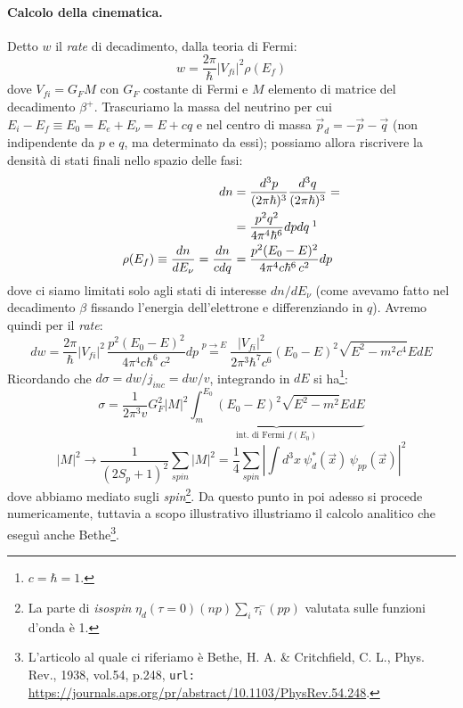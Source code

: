 \paragraph{Calcolo della cinematica.}Detto $w$ il \textit{rate} di decadimento, dalla teoria di Fermi:
$$w = \frac{2\pi}{\hbar}|V_{fi}|^2\rho(E_f)$$
dove $V_{fi} = G_F M$ con $G_F$ costante di Fermi e $M$ elemento di matrice del decadimento $\beta^+$. Trascuriamo la massa del neutrino per cui $E_i-E_f\equiv E_0 = E_e + E_\nu = E + cq$ e nel centro di massa $\vec{p}_d = -\vec{p}-\vec{q}$ (non indipendente da $p$ e $q$, ma determinato da essi); possiamo allora riscrivere la densità di stati finali nello spazio delle fasi:
\begin{displaymath}
\begin{aligned}
dn &= \frac{d^3 p}{(2\pi\hbar)^3}\frac{d^3 q}{(2\pi\hbar)^3} =\\
&= \frac{p^2 q^2}{4\pi^4 \hbar^6} dpdq\: \footnotemark \\
\rho(E_f)\equiv \frac{dn}{dE_\nu} = \frac{dn}{cdq} &= \frac{p^2 (E_0-E)^2}{4\pi^4 c \hbar^6\,c^2} dp
\end{aligned}
\end{displaymath}
dove ci siamo limitati solo agli stati di interesse $dn/dE_\nu$ (come avevamo fatto nel decadimento $\beta$ fissando l'energia dell'elettrone e differenziando in $q$). Avremo quindi per il \textit{rate}:
$$dw = \frac{2\pi}{\hbar}|V_{fi}|^2\,\frac{p^2 (E_0-E)^2}{4\pi^4 c \hbar^6\,c^2} dp \stackrel{p\to E}{=} \frac{|V_{fi}|^2}{2\pi^3 \hbar^7 c^6} (E_0-E)^2 \sqrt{E^2 - m^2c^4} E dE $$
Ricordando che $d\sigma = dw/j_{inc} = dw/v$, integrando in $dE$ si ha\footnote{$c=\hbar=1$.}:
$$\sigma = \frac{1}{2\pi^3 v} G_F^2 |M|^2 \underbrace{\int_m^{E_0} (E_0-E)^2 \sqrt{E^2-m^2}E dE}_{\text{int. di Fermi } f(E_0)} $$
$$|M|^2 \to \frac{1}{(2S_p +1)^2} \sum_{spin} |M|^2 = \frac{1}{4} \sum_{spin} |\int d^3x\: \psi^*_d (\vec{x})\,\psi_{pp}(\vec{x})|^2$$
dove abbiamo mediato sugli \textit{spin}\footnote{La parte di \textit{isospin} $\eta_d(\tau=0)(np)\sum_i\tau^-_i (pp)$ valutata sulle funzioni d'onda è 1.}. Da questo punto in poi adesso si procede numericamente, tuttavia a scopo illustrativo illustriamo il calcolo analitico che eseguì anche Bethe\footnote{L'articolo al quale ci riferiamo è Bethe, H. A. \& Critchfield, C. L., Phys. Rev., 1938, vol.54, p.248, \texttt{url:} \url{https://journals.aps.org/pr/abstract/10.1103/PhysRev.54.248}.}.

